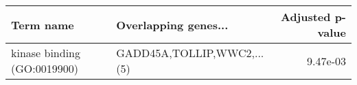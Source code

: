 \begin{tabular}{llr}
\toprule
                  Term name &       Overlapping genes... &  Adjusted p-value \\
\midrule
kinase binding (GO:0019900) & GADD45A,TOLLIP,WWC2,...(5) &          9.47e-03 \\
\bottomrule
\end{tabular}
